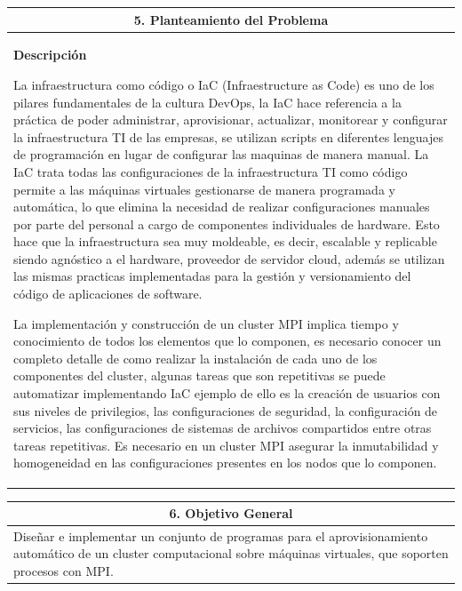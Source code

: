 \documentclass[letter,12pt]{article}
\begin{document}
\begin{center}
\begin{tabular}{|p{15.5cm}|}
\hline
\multicolumn{1}{|c|}{ \textbf{5. Planteamiento del Problema} }\\
\hline
\textbf{Descripción}

La infraestructura como código o IaC (Infraestructure as Code) es uno de los pilares fundamentales de la cultura DevOps, la IaC hace referencia a la práctica de poder administrar, aprovisionar, actualizar, monitorear y configurar la infraestructura TI de las empresas, se utilizan scripts en diferentes lenguajes de programación en lugar de configurar las maquinas de manera manual. La IaC trata todas las configuraciones de la infraestructura TI como código permite a las máquinas virtuales gestionarse de manera programada y automática, lo que elimina la necesidad de realizar configuraciones manuales por parte del personal a cargo de componentes individuales de hardware. Esto hace que la infraestructura sea muy moldeable, es decir, escalable y replicable siendo agnóstico a el hardware, proveedor de servidor cloud, además se utilizan las mismas practicas implementadas para la gestión y versionamiento del código de aplicaciones de software. 

La implementación y construcción de un cluster MPI implica  tiempo y conocimiento de todos los elementos que lo componen, es necesario conocer un completo detalle de como realizar la instalación de cada uno de los componentes del cluster, algunas tareas que son repetitivas se puede automatizar implementando IaC ejemplo de ello es la creación de usuarios con sus niveles de privilegios, las configuraciones de seguridad, la configuración de servicios, las configuraciones de sistemas de archivos compartidos entre otras tareas repetitivas. Es necesario en un cluster MPI asegurar la inmutabilidad y homogeneidad en las configuraciones presentes en los nodos que lo componen.

\hline
\end{tabular}
\end{center}

\begin{center}
\begin{tabular}{|p{15.5cm}|}
\hline
\multicolumn{1}{|c|}{ \textbf{6. Objetivo General}}\\
\hline
Diseñar e implementar un conjunto de programas para el aprovisionamiento automático de un cluster computacional sobre máquinas virtuales, que soporten procesos con MPI.
\\
\hline
\end{tabular}
\end{center}
\end{document}

